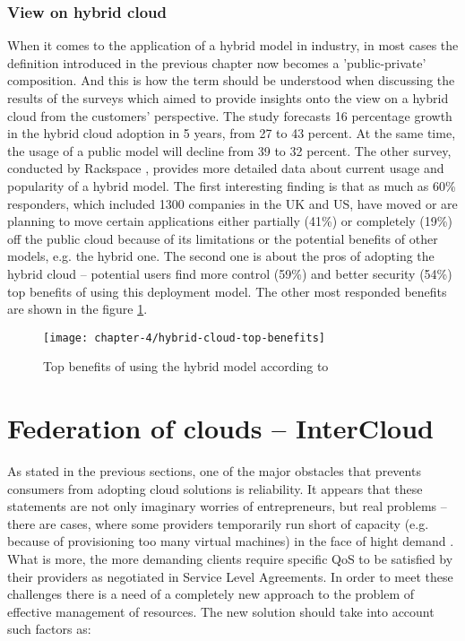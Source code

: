 \subsubsection*{View on hybrid cloud}
When it comes to the application of a hybrid model in industry, in most cases the definition introduced in the previous chapter now becomes a 'public-private' composition. And this is how the term should be understood when discussing the results of the surveys which aimed to provide insights onto the view on a hybrid cloud from the customers' perspective.
The study \cite{NBSurvey13} forecasts 16 percentage growth in the hybrid cloud adoption in 5 years, from 27 to 43 percent. At the same time, the usage of a public model will decline from 39 to 32 percent.
The other survey, conducted by Rackspace \cite{RackspaceSurvey13}, provides more detailed data about current usage and popularity of a hybrid model. The first interesting finding is that as much as 60\% responders, which included 1300 companies in the UK and US, have moved or are planning to move certain applications either partially (41\%) or completely (19\%) off the public cloud because of its limitations or the potential benefits of other models, e.g. the hybrid one. The second one is about the pros of adopting the hybrid cloud  -- potential users find more control (59\%) and better security (54\%) top benefits of using this deployment model. The other most responded benefits are shown in the figure \ref{ch4:hybrid-cloud-top-benefits}.

\begin{figure}[!ht]
  \begin{center}
    \texttt{[image: chapter-4/hybrid-cloud-top-benefits]}
  \end{center}
  \caption{Top benefits of using the hybrid model according to \cite{RackspaceSurvey13}}
  \label{ch4:hybrid-cloud-top-benefits}
\end{figure}

\section{Federation of clouds -- InterCloud}
As stated in the previous sections, one of the major obstacles that prevents consumers from adopting cloud solutions is reliability. It appears that these statements are not only imaginary worries of entrepreneurs, but real problems -- there are cases, where some providers temporarily run short of capacity (e.g. because of provisioning too many virtual machines) in the face of hight demand \cite{Lavitt09}. What is more, the more demanding clients require specific QoS to be satisfied by their providers as negotiated in Service Level Agreements.
In order to meet these challenges there is a need of a completely new approach to the problem of effective management of resources. The new solution should take into account such factors as:

